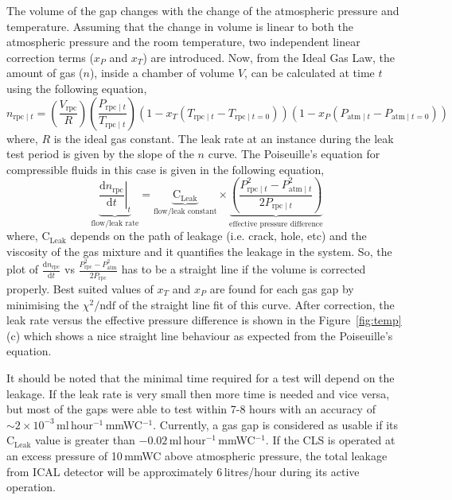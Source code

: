 The volume of the gap changes with the change of the atmospheric
pressure and temperature. Assuming that the change in volume is linear
to both the atmospheric pressure and the room temperature, two
independent linear correction terms ($x_P$ and $x_T$) are introduced.
Now, from the Ideal Gas Law, the amount of gas ($n$), inside a chamber
of volume $V$, can be calculated at time $t$ using the following
equation,
\begin{equation}
  n_{\textrm{rpc}\mid t}=\left(\frac{V_{\textrm{rpc}}}{R}\right)\left(\frac{P_{\textrm{rpc}\mid t}}{T_{\textrm{rpc}\mid t}}\right)\left(1-x_T\left(T_{\textrm{rpc}\mid t}-T_{\textrm{rpc}\mid t=0}\right)\right)\left(1-x_P\left(P_{\textrm{atm}\mid t}-P_{\textrm{atm}\mid t=0}\right)\right) \label{eq:ct}
\end{equation}
where, $R$ is the ideal gas constant. The leak rate at an instance
during the leak test period is given by the slope of the $n$ curve.
The Poiseuille's equation \cite{poiseuille} for compressible fluids in
this case is given in the following equation,
\begin{equation}
  \underbrace{\left.\frac{\mathrm{d}n_{\textrm{rpc}}}{\mathrm{d}t}\right| _t}_\text{flow/leak rate}=\underbrace{\textrm{C}_{\textrm{Leak}}}_\text{flow/leak constant}\times\underbrace{\left(\frac {P_{{\textrm{rpc}\mid t} }^{2}-P_{{\textrm{atm}\mid t} }^{2}}{2P_{{\textrm{rpc}\mid t} }}\right)}_\text{effective pressure difference}\label{eq:poiseuille}
\end{equation}
where, $\textrm{C}_{\textrm{Leak}}$ depends on the path of leakage
(i.e. crack, hole, etc) and the viscosity of the gas mixture and it
quantifies the leakage in the system. So, the plot of
$\frac{\mathrm{d}n_{\textrm{rpc}}}{\mathrm{d}t}$ vs
$\frac{P_{\textrm{rpc}}^{2}-P_{\textrm{atm}}^{2}}{2P_{\textrm{rpc}}}$ has to be
a straight line if the volume is corrected properly. Best suited
values of $x_T$ and $x_P$ are found for each gas gap by minimising the
$\chi^2/\textrm{ndf}$ of the straight line fit of this curve. After
correction, the leak rate versus the effective pressure difference is
shown in the Figure~\ref{fig:temp}(c) which shows a nice straight line
behaviour as expected from the Poiseuille's equation. 

It should be noted that the minimal time required for a test will
depend on the leakage. If the leak rate is very small then more time
is needed and vice versa, but most of the gaps were able to test
within 7-8 hours with an accuracy of
$\sim 2\times 10^{-3}$\,ml\,hour$^{-1}$\,mmWC$^{-1}$. Currently, a gas
gap is considered as usable if its $\textrm{C}_{\textrm{Leak}}$ value is
greater than $-0.02$\,ml\,hour$^{-1}$\,mmWC$^{-1}$. If the CLS is
operated at an excess pressure of 10\,mmWC above atmospheric pressure,
the total leakage from ICAL detector will be approximately
6\,litres/hour during its active operation.

